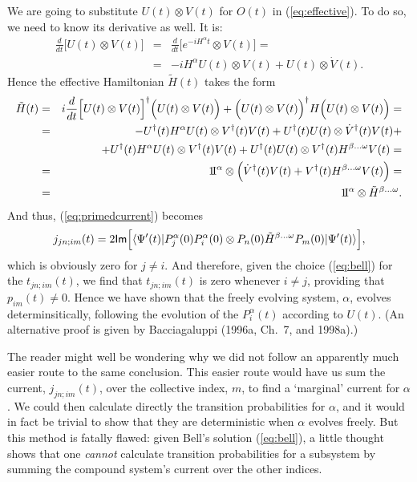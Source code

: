 \documentclass[12pt]{article}
\newcommand{\be}{\begin{equation}}
\newcommand{\ee}{\end{equation}}
\newcommand{\ident}{1\!{\rm I}}                                 %
\newcommand{\ga}{\alpha}                                        %
\newcommand{\gb}{\beta}                                         %
\newcommand{\gw}{\omega}                                        %
\renewcommand{\Im}{\mbox{{\sf Im}}}                             %
\newcommand{\bra}[1]{\langle #1\vert}                           %
\newcommand{\ket}[1]{\vert #1\rangle}                           %
\begin{document}
We are going to substitute $U(t) \otimes V(t)$ for $O(t)$ in 
(\ref{eq:effective}).  To do so, we need to know its derivative as 
well.  It is:
\begin{eqnarray}
  {\displaystyle \frac{d}{dt} \Big[ U(t) \otimes V(t) \Big] }   
  & = &
  {\displaystyle  \frac{d}{dt} \Big[ e^{-iH^{\ga}t} \otimes V(t)
  \Big]= } \nonumber \\[1ex]
  \ & = &  -iH^{\ga}U(t) \otimes V(t) + U(t) \otimes \dot{V}(t).
  \label{eq:derivative}
\end{eqnarray}
Hence the effective Hamiltonian $\tilde{H}(t)$ takes the form
\begin{eqnarray}
  \tilde{H}(t)  & = &
  i\frac{d}{dt}\Big[U(t)\otimes V(t)\Big]^{\dagger} 
  \Big(U(t)\otimes V(t)\Big) + \Big(U(t)\otimes V(t)\Big)^{\dagger} 
  H \Big(U(t)\otimes V(t)\Big) =
  \nonumber   \\
  & = &
  - U^{\dagger}(t)H^{\ga}U(t) \otimes V^{\dagger}(t)V(t)
  + U^{\dagger}(t)U(t) \otimes \dot{V}^{\dagger}(t)V(t)+
  \nonumber    \\
  &   &
  + U^{\dagger}(t)H^{\ga}U(t) \otimes V^{\dagger}(t)V(t)
  + U^{\dagger}(t)U(t) \otimes V^{\dagger}(t)H^{\gb\ldots\gw}V(t)=
  \nonumber    \\
  & = &
  \ident^{\ga} \otimes \Big(\dot{V}^{\dagger}(t)V(t)
  + V^{\dagger}(t)H^{\gb\ldots\gw}V(t)\Big)=
  \nonumber     \\
  & = &
  \ident^{\ga} \otimes \tilde{H}^{\gb\ldots\gw}.
  \label{eq:effective2}
\end{eqnarray}
And thus, (\ref{eq:primedcurrent}) becomes
\be
  j_{jn;im}(t) = 2 \Im \Big[\bra{\Psi'(t)} P^{\ga}_j(0)P^{\ga}_i(0) 
  \otimes  P_n(0)\tilde{H}^{\gb\ldots\gw}P_m(0) \ket{\Psi'(t)}\Big],
  \label{eq:zerocurrent}
\ee
which is obviously zero for $j\neq i$.  And therefore, given the 
choice (\ref{eq:bell}) for the $t_{jn;im}(t)$, we find that 
$t_{jn;im}(t)$ is zero whenever $i \neq j$, providing that $p_{im}(t)
\neq 0$.  Hence we have shown that the freely evolving system, $\ga$,
evolves determinsitically, following the evolution of the
$P^{\ga}_{i}(t)$ according to $U(t)$. (An alternative proof is given by
Bacciagaluppi (1996a, Ch.~7, and 1998a).)

The reader might well be wondering why we did not follow an apparently 
much easier route to the same conclusion.  This easier route would 
have us sum the current, $j_{jn;im}(t)$, over the collective index, 
$m$, to find a `marginal' current for $\ga$.  We could then calculate 
directly the transition probabilities for $\ga$, and it would in fact 
be trivial to show that they are deterministic when $\ga$ evolves 
freely.  But this method is fatally flawed: given Bell's solution 
(\ref{eq:bell}), a little thought shows that one {\it cannot} 
calculate transition probabilities for a subsystem by summing the 
compound system's current over the other indices.
\end{document}
